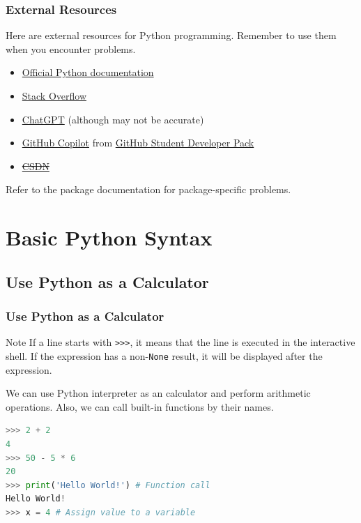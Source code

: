 \documentclass[beamer, en, version=2.0]{huangfusl-template}
\begin{document}
    \begin{frame}[fragile]
        \frametitle{External Resources}

        Here are external resources for Python programming. Remember to use them when you encounter problems.

        \begin{itemize}
            \item \href{https://docs.python.org/3/}{\color{darkblue} Official Python documentation}
            \item \href{https://www.stackoverflow.com/}{\color{darkblue} Stack Overflow}
            \item \href{https://chat.openai.com/}{\color{darkblue} ChatGPT} (although may not be accurate)
            \item \href{https://github.com/features/copilot}{\color{darkblue} GitHub Copilot} from \href{https://education.github.com/discount_requests/application}{\color{darkblue} GitHub Student Developer Pack}
            \item \href{https://www.csdn.net/}{\color{darkred}\sout{CSDN}}
        \end{itemize}

        Refer to the package documentation for package-specific problems.
    \end{frame}
    \section{Basic Python Syntax}
    \subsection{Use Python as a Calculator}
    \begin{frame}[fragile]
        \frametitle{Use Python as a Calculator}

        \begin{block}{Note}
            If a line starts with {\footnotesize\verb|>>>|}, it means that the line is executed in the interactive shell. If the expression has a non-{\footnotesize\verb|None|} result, it will be displayed after the expression.
        \end{block}

        We can use Python interpreter as an calculator and perform arithmetic operations. Also, we can call built-in functions by their names.

\begin{lstlisting}[language=python]
>>> 2 + 2
4
>>> 50 - 5 * 6
20
>>> print('Hello World!') # Function call
Hello World!
>>> x = 4 # Assign value to a variable
\end{lstlisting}
    \end{frame}
\end{document}
